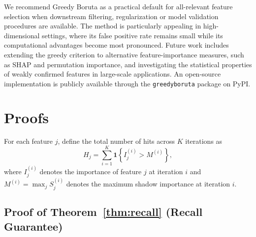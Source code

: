 \documentclass[runningheads]{llncs}
\begin{document}
We recommend Greedy Boruta as a practical default for all-relevant feature selection when downstream filtering, regularization or model validation procedures are available. The method is particularly appealing in high-dimensional settings, where its false positive rate remains small while its computational advantages become most pronounced. Future work includes extending the greedy criterion to alternative feature-importance measures, such as SHAP and permutation importance, and investigating the statistical properties of weakly confirmed features in large-scale applications. An open-source implementation is publicly available through the \texttt{greedyboruta} package on PyPI.






\appendix
\renewcommand{\theHsection}{\Alph{section}}

\section{Proofs}
\label{app:proofs}

For each feature $j$, define the total number of hits across $K$ iterations as
\[
H_j = \sum_{i=1}^{K} \mathbf{1}\!\left\{ I_j^{(i)} > M^{(i)} \right\},
\]
where $I_j^{(i)}$ denotes the importance of feature $j$ at iteration $i$ and $M^{(i)} = \max_j S_j^{(i)}$ denotes the maximum shadow importance at iteration $i$.

\subsection{Proof of Theorem~\ref{thm:recall} (Recall Guarantee)}
\end{document}
